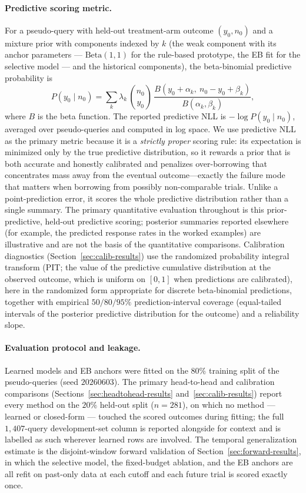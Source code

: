 \documentclass[11pt]{article}
\begin{document}
\paragraph{Predictive scoring metric.} For a pseudo-query with held-out
treatment-arm outcome $(y_0, n_0)$ and a mixture prior with components indexed
by $k$ (the weak component with its anchor parameters --- $\mathrm{Beta}(1,1)$
for the rule-based prototype, the EB fit for the selective model --- and the historical
components), the beta-binomial predictive probability is
\begin{equation}
P(y_0 \mid n_0) = \sum_k \lambda_k\,\binom{n_0}{y_0}\,
\frac{B(y_0+\alpha_k,\ n_0-y_0+\beta_k)}{B(\alpha_k,\beta_k)},
\end{equation}
where $B$ is the beta function. The reported predictive NLL is
$-\log P(y_0 \mid n_0)$, averaged over pseudo-queries and computed in log space.
We use predictive NLL as the primary metric because it is a \emph{strictly
proper} scoring rule: its expectation is minimized only by the true predictive
distribution, so it rewards a prior that is both accurate and honestly
calibrated and penalizes over-borrowing that concentrates mass away from the
eventual outcome---exactly the failure mode that matters when borrowing from
possibly non-comparable trials. Unlike a point-prediction error, it scores the
whole predictive distribution rather than a single summary. The primary
quantitative evaluation throughout is this prior-predictive,
held-out predictive scoring; posterior summaries reported elsewhere (for
example, the predicted response rates in the worked examples) are illustrative
and are not the basis of the quantitative comparisons.
Calibration diagnostics (Section~\ref{sec:calib-results}) use the randomized
probability integral transform (PIT; the value of the predictive cumulative
distribution at the observed outcome, which is uniform on $[0,1]$ when
predictions are calibrated), here in the randomized form appropriate for
discrete beta-binomial predictions, together with empirical $50/80/95\%$
prediction-interval coverage (equal-tailed intervals of the posterior
predictive distribution for the outcome) and a reliability slope.

\paragraph{Evaluation protocol and leakage.} Learned models and EB anchors
were fitted on the $80\%$ training split of the pseudo-queries (seed
$20260603$). The primary head-to-head and calibration comparisons
(Sections~\ref{sec:headtohead-results} and~\ref{sec:calib-results}) report
every method on the $20\%$ held-out split ($n = 281$), on which no method
--- learned or closed-form --- touched the scored outcomes during fitting;
the full $1{,}407$-query development-set column is reported alongside for
context and is labelled as such wherever learned rows are involved. The
temporal generalization estimate is the disjoint-window forward validation of
Section~\ref{sec:forward-results}, in which the selective model, the
fixed-budget ablation, and the EB anchors are all refit on past-only data at
each cutoff and each future trial is scored exactly once.
\end{document}
